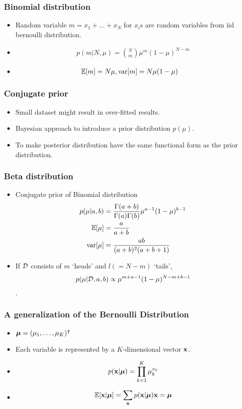 \documentclass[10pt,mathserif]{beamer}
\begin{document}
\begin{frame}
\frametitle{Binomial distribution}
\begin{itemize}\itemsep=12pt
\item Random variable $m=x_1+\ldots+x_N$ for $x_i$s are random variables from iid bernoulli distribution.
\item
\begin{align}
p(m| N,\mu)= {N \choose m} \mu^m (1-\mu)^{N-m}\nonumber
\end{align}
\item
\begin{align}
    \mathbb{E}[m]&= N\mu, \mathrm{var}[m]= N\mu(1-\mu)\nonumber
\end{align}
\end{itemize}
\end{frame}
\begin{frame}
\frametitle{Conjugate prior }
\begin{itemize}\itemsep=12pt
\item Small dataset might result in over-fitted results.
\item Bayesian approach to introduce a prior distribution $p(\mu)$.
\item To make posterior distribution have the same functional form as the prior distribution.
\end{itemize}
\end{frame}
\begin{frame}
\frametitle{Beta distribution}
\begin{itemize}\itemsep=12pt
\item Conjugate prior of Binomial distribution
\begin{align}
p(\mu| a,b) &= \frac{\Gamma(a+b)}{\Gamma(a)\Gamma(b)} \mu^{a-1}(1-\mu)^{b-1}\nonumber\\
\mathbb{E}[\mu] &= \frac{a}{a+b} \nonumber\\
\mathrm{var}[\mu] &= \frac{ab}{(a+b)^2(a+b+1)} \nonumber
\end{align}
\item If $\mathcal{D}$ consists of $m$ `heads' and $l(=N-m)$ `tails', 
\begin{align}
p(\mu | \mathcal{D},a,b) \propto \mu^{m+a-1}(1-\mu)^{N-m+b-1} \nonumber
\end{align}.
\end{itemize}
\end{frame}
\begin{frame}
\frametitle{A generalization of the Bernoulli Distribution}
\begin{itemize}\itemsep=12pt
\item $\boldsymbol{\mu} = (\mu_1,\ldots, \mu_K)^\intercal$
\item Each variable is represented by a $K$-dimensional vector $\mathbf{x}$.
\item 
\begin{align}
p(\mathbf{x} | \boldsymbol{\mu}) = \prod_{k=1}^K \mu_k^{x_k}\nonumber
\end{align}
\item
\begin{align}
\mathbb{E}[\mathbf{x} | \boldsymbol{\mu}] = \sum_{\mathbf{x}} p(\mathbf{x} | \boldsymbol{\mu}) \mathbf{x} = \boldsymbol{\mu}\nonumber
\end{align}
\end{itemize}
\end{frame}
\end{document}
